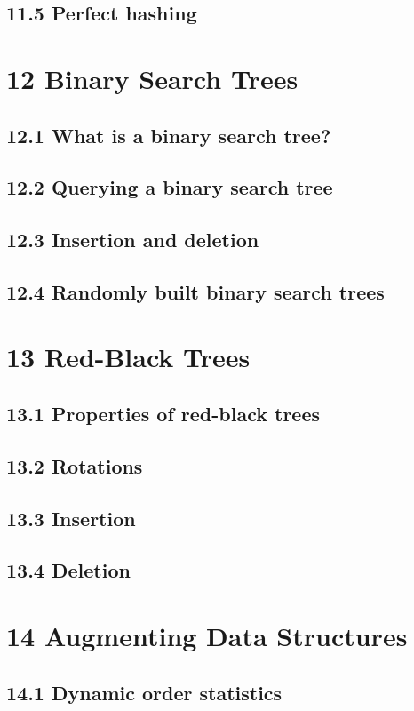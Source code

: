 \documentclass[a4paper]{article}
\begin{document}
\subsection{11.5 Perfect hashing}

\newpage
\section{12 Binary Search Trees}
\subsection{12.1 What is a binary search tree?}
\subsection{12.2 Querying a binary search tree}
\subsection{12.3 Insertion and deletion}
\subsection{12.4 Randomly built binary search trees}

\newpage
\section{13 Red-Black Trees}
\subsection{13.1 Properties of red-black trees}
\subsection{13.2 Rotations}
\subsection{13.3 Insertion}
\subsection{13.4 Deletion}

\newpage
\section{14 Augmenting Data Structures}
\subsection{14.1 Dynamic order statistics}
\end{document}
